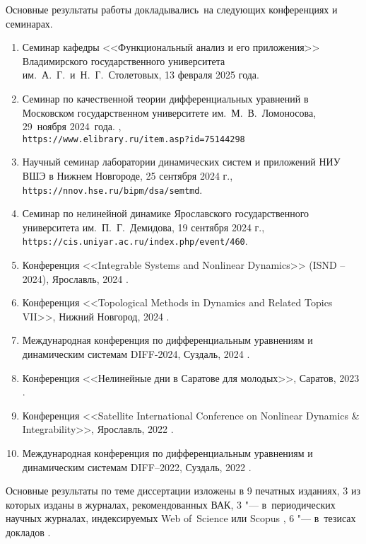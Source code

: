 {\probation}
Основные результаты работы докладывались~на следующих конференциях и семинарах.
\begin{enumerate}
	\item Семинар кафедры <<Функциональный анализ и его приложения>> Владимирского государственного университета им.~А.~Г.~и~Н.~Г.~Столетовых, 13 февраля 2025 года.
	\item Семинар по качественной теории дифференциальных уравнений в Московском государственном университете им.~М.~В.~Ломоносова, 29~ноября 2024~года. \cite{Sergeev2024},\\\texttt{https://www.elibrary.ru/item.asp?id=75144298}
	\item Научный семинар лаборатории динамических систем и приложений НИУ ВШЭ в Нижнем Новгороде, 25 сентября 2024 г.,\\\texttt{https://nnov.hse.ru/bipm/dsa/semtmd}.
	\item Семинар по нелинейной динамике Ярославского государственного университета им.~П.~Г.~Демидова, 19 сентября 2024 г.,\\\texttt{https://cis.uniyar.ac.ru/index.php/event/460}.
	\item Конференция <<Integrable Systems and Nonlinear Dynamics>> (ISND – 2024), Ярославль, 2024 \cite{confbib5}.
	\item Конференция <<Topological Methods in Dynamics and Related Topics VII>>, Нижний Новгород, 2024 \cite{confbib6}.
	\item Международная конференция по дифференциальным уравнениям и динамическим системам DIFF-2024, Суздаль, 2024 \cite{confbib3}.
	\item Конференция <<Нелинейные дни в Саратове для молодых>>, Саратов, 2023 \cite{confbib2}.
	\item Конференция <<Satellite International Conference on Nonlinear Dynamics {\&} Integrability>>, Ярославль, 2022 \cite{confbib4}.
	\item Международная конференция по дифференциальным уравнениям и динамическим системам DIFF--2022, Суздаль, 2022 \cite{confbib1}.
\end{enumerate}



\bigskip

{\publications} Основные результаты по теме диссертации изложены в 9 печатных изданиях, 3 из которых \cite{wosbib1,wosbib2,scbib1} изданы в журналах, рекомендованных ВАК, 3 "--- в~периодических научных журналах, индексируемых Web of~Science или Scopus \cite{wosbib1,wosbib2,scbib1}, 6 "--- в~тезисах докладов \cite{confbib1,confbib2,confbib3,confbib4,confbib5,confbib6}. 

